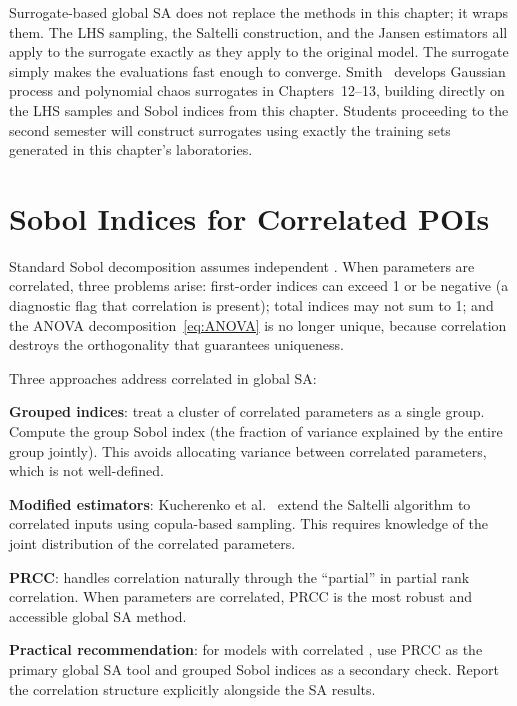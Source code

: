 Surrogate-based global SA does not replace the methods in this chapter;
it wraps them. The LHS sampling, the Saltelli construction, and the
Jansen estimators all apply to the surrogate exactly as they apply
to the original model. The surrogate simply makes the evaluations
fast enough to converge.
Smith~\cite{smith2014uncertainty} develops Gaussian process and
polynomial chaos surrogates in Chapters~12--13, building directly
on the LHS samples and Sobol indices from this chapter.
Students proceeding to the second semester will construct surrogates
using exactly the training sets generated in this chapter's laboratories.

\section{Sobol Indices for Correlated POIs}
\label{sec:correlatedsobol}

Standard Sobol decomposition assumes independent \POIs. When parameters
are correlated, three problems arise: first-order indices can exceed 1 or
be negative (a diagnostic flag that correlation is present); total indices
may not sum to 1; and the ANOVA decomposition~\eqref{eq:ANOVA} is no longer
unique, because correlation destroys the orthogonality that guarantees uniqueness.

Three approaches address correlated \POIs in global SA:

\textbf{Grouped indices}: treat a cluster of correlated parameters as
a single group. Compute the group Sobol index (the fraction of variance
explained by the entire group jointly). This avoids allocating variance
between correlated parameters, which is not well-defined.

\textbf{Modified estimators}: Kucherenko et al.~\cite{kucherenko2012estimation}
extend the Saltelli algorithm to correlated inputs using copula-based
sampling. This requires knowledge of the joint distribution of the
correlated parameters.

\textbf{PRCC}: handles correlation naturally through the ``partial''
in partial rank correlation. When parameters are correlated, PRCC
is the most robust and accessible global SA method.

\textbf{Practical recommendation}: for models with correlated \POIs,
use PRCC as the primary global SA tool and grouped Sobol indices as
a secondary check. Report the correlation structure explicitly alongside
the SA results.

